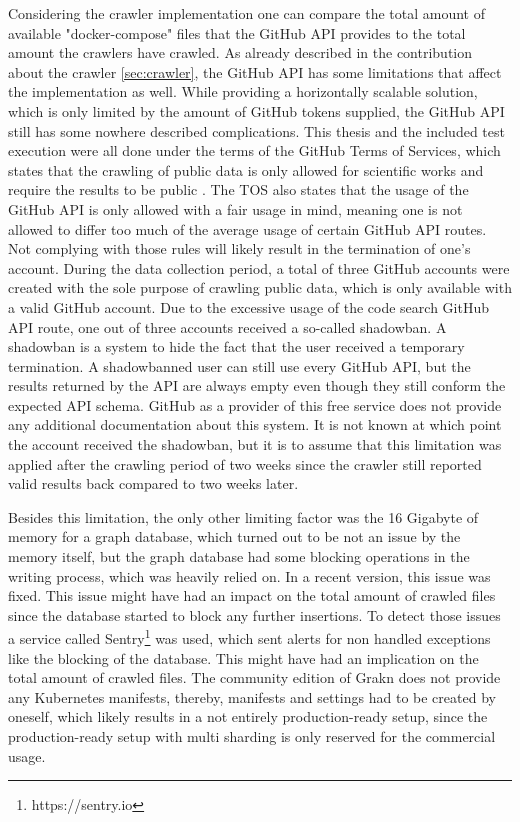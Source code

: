 Considering the crawler implementation one can compare the total amount of available "docker-compose" files that the GitHub API provides to the total amount the crawlers have crawled. As already described in the contribution about the crawler \ref{sec:crawler}, the GitHub API has some limitations that affect the implementation as well. While providing a horizontally scalable solution, which is only limited by the amount of GitHub tokens supplied, the GitHub API still has some nowhere described complications. This thesis and the included test execution were all done under the terms of the GitHub Terms of Services, which states that the crawling of public data is only allowed for scientific works and require the results to be public \cite{githubTos1}\cite{githubTos2}\cite{githubTos3}. The TOS also states that the usage of the GitHub API is only allowed with a fair usage in mind, meaning one is not allowed to differ too much of the average usage of certain GitHub API routes. Not complying with those rules will likely result in the termination of one's account. During the data collection period, a total of three GitHub accounts were created with the sole purpose of crawling public data, which is only available with a valid GitHub account. Due to the excessive usage of the code search GitHub API route, one out of three accounts received a so-called shadowban. A shadowban is a system to hide the fact that the user received a temporary termination. A shadowbanned user can still use every GitHub API, but the results returned by the API are always empty even though they still conform the expected API schema. GitHub as a provider of this free service does not provide any additional documentation about this system. It is not known at which point the account received the shadowban, but it is to assume that this limitation was applied after the crawling period of two weeks since the crawler still reported valid results back compared to two weeks later.

Besides this limitation, the only other limiting factor was the 16 Gigabyte of memory for a graph database, which turned out to be not an issue by the memory itself, but the graph database had some blocking operations in the writing process, which was heavily relied on. In a recent version, this issue was fixed. This issue might have had an impact on the total amount of crawled files since the database started to block any further insertions. To detect those issues a service called Sentry\footnote{https://sentry.io} was used, which sent alerts for non handled exceptions like the blocking of the database. This might have had an implication on the total amount of crawled files. The community edition of Grakn does not provide any Kubernetes manifests, thereby, manifests and settings had to be created by oneself, which likely results in a not entirely production-ready setup, since the production-ready setup with multi sharding is only reserved for the commercial usage.

